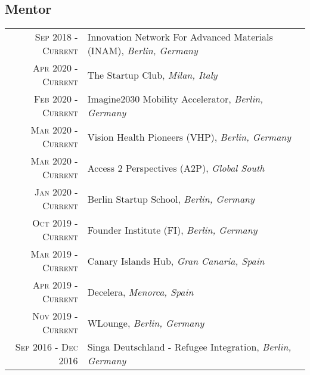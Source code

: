 \subsection{Mentor}
\begin{longtable}
	{r|p{13cm}}
	\textsc{Sep 2018 - Current} & Innovation Network For Advanced Materials (INAM), \emph{Berlin, Germany}\\
	\textsc{Apr 2020 - Current} & The Startup Club, \emph{Milan, Italy}\\
	\textsc{Feb 2020 - Current} & Imagine2030 Mobility Accelerator, \emph{Berlin, Germany}\\
	\textsc{Mar 2020 - Current} & Vision Health Pioneers (VHP), \emph{Berlin, Germany}\\
	\textsc{Mar 2020 - Current} & Access 2 Perspectives (A2P), \emph{Global South}\\
	\textsc{Jan 2020 - Current} & Berlin Startup School, \emph{Berlin, Germany}\\
	\textsc{Oct 2019 - Current} & Founder Institute (FI), \emph{Berlin, Germany}\\
	\textsc{Mar 2019 - Current} & Canary Islands Hub, \emph{Gran Canaria, Spain}\\
	\textsc{Apr 2019 - Current} & Decelera, \emph{Menorca, Spain}\\
	\textsc{Nov 2019 - Current} & WLounge, \emph{Berlin, Germany}\\
	\textsc{Sep 2016 - Dec 2016} & Singa Deutschland - Refugee Integration, \emph{Berlin, Germany}\\
\end{longtable}
